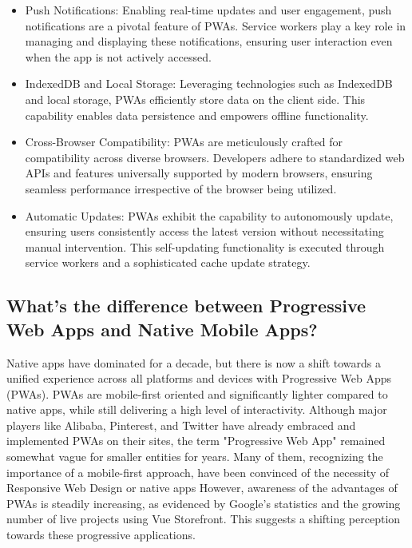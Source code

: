 \documentclass[12pt,a4paper, twosite]{article}
\begin{document}
\begin{itemize}
  \item Push Notifications:
  Enabling real-time updates and user engagement, push notifications are a pivotal feature of PWAs. Service workers play a key role in managing and displaying these notifications, ensuring user interaction even when the app is not actively accessed.

  \item IndexedDB and Local Storage:
  Leveraging technologies such as IndexedDB and local storage, PWAs efficiently store data on the client side. This capability enables data persistence and empowers offline functionality.

  \item Cross-Browser Compatibility:
  PWAs are meticulously crafted for compatibility across diverse browsers. Developers adhere to standardized web APIs and features universally supported by modern browsers, ensuring seamless performance irrespective of the browser being utilized.

  \item Automatic Updates:
  PWAs exhibit the capability to autonomously update, ensuring users consistently access the latest version without necessitating manual intervention. This self-updating functionality is executed through service workers and a sophisticated cache update strategy.
\end{itemize}

\subsection{What’s the difference between Progressive Web Apps and Native Mobile Apps?}
\label{sec:orgaf51da6}


Native apps have dominated for a decade, but 
there is now a shift towards a unified experience 
across all platforms and devices with Progressive Web Apps 
(PWAs). PWAs are mobile-first oriented and significantly lighter 
compared to native apps, while still delivering a high level of 
interactivity.
Although major players like Alibaba, Pinterest, and 
Twitter have already embraced and implemented PWAs on their 
sites, the term "Progressive Web App" remained somewhat vague 
for smaller entities for years. Many of them, recognizing the 
importance of a mobile-first approach, have been convinced of the 
necessity of Responsive Web Design or native apps
However, awareness of the advantages of PWAs is steadily 
increasing, as evidenced by Google's statistics and the growing 
number of live projects using Vue Storefront. This suggests a 
shifting perception towards these progressive applications.
\end{document}
